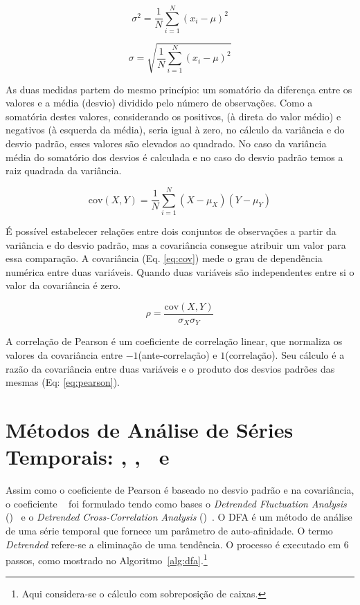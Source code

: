 \begin{equation}\label{eq:var}
\sigma^2 = \frac{1}{N} \sum_{i=1}^{N} (x_i - \mu)^2
\end{equation}

\begin{equation}\label{eq:std}
  \sigma = \sqrt{\frac{1}{N} \sum_{i=1}^{N} (x_i - \mu)^2}
\end{equation}

As duas medidas partem do mesmo princípio: um somatório da diferença entre os valores e a média (desvio) dividido pelo número de observações. Como a somatória destes valores, considerando os positivos, (à direta do valor médio) e negativos (à esquerda da média), seria igual à zero, no cálculo da variância e do desvio padrão, esses valores são elevados ao quadrado. No caso da variância média do somatório dos desvios é calculada e no caso do desvio padrão temos a raiz quadrada da variância. 

\begin{equation}\label{eq:cov}
  \text{cov}(X,Y) = \frac{1}{N} \sum_{i=1}^{N}(X - \mu_X)(Y - \mu_Y)
\end{equation}

É possível estabelecer relações entre dois conjuntos de observações a partir da variância e do desvio padrão, mas a covariância consegue atribuir um valor para essa comparação. A covariância (Eq. \ref{eq:cov}) mede o grau de dependência numérica entre duas variáveis. Quando duas variáveis são independentes entre si o valor da covariância é zero. 

\begin{equation}\label{eq:pearson}
  \rho = \frac{\text{cov}(X,Y)}{\sigma_X \sigma_Y}
\end{equation}

A correlação de Pearson é um coeficiente de correlação linear, que normaliza os valores da covariância entre $-1$(ante-correlação) e $1$(correlação). Seu cálculo é a razão da covariância entre duas variáveis e o produto dos desvios padrões das mesmas (Eq: \ref{eq:pearson}).


\section{Métodos de Análise de Séries Temporais: \dfa, \dcca, \pdcca~e \dmc}
\label{sec:dmc}

Assim como o coeficiente de Pearson é baseado no desvio padrão e na covariância, o coeficiente \pdcca~\cite{Zebende2011} foi formulado tendo como bases o \emph{Detrended Fluctuation Analysis} (\dfa)~\cite{Peng_1994} e o \emph{Detrended Cross-Correlation Analysis} (\dcca)~\cite{Podobnik2008}. O DFA é um método de análise de uma série temporal que fornece um parâmetro de auto-afinidade. O termo \emph{Detrended} refere-se a eliminação de uma tendência. O processo é executado em 6 passos, como mostrado no Algoritmo~\ref{alg:dfa}.\footnote{Aqui considera-se o cálculo com sobreposição de caixas.}


